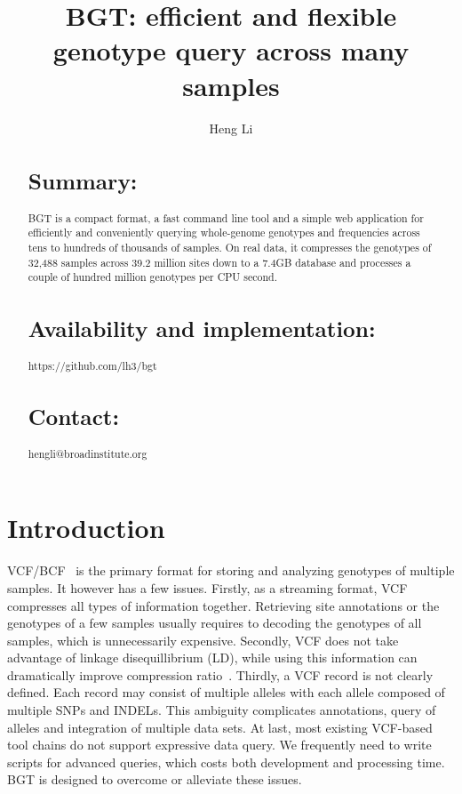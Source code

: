 \documentclass{bioinfo}
\begin{document}

\title[Large-scale Genotype Query]{BGT: efficient and flexible genotype query across many samples}

\author[Li]{Heng Li}

\address{Broad Institute, 7 Cambridge Center, Cambridge, MA 02142, USA}

\maketitle

\begin{abstract}
\section{Summary:} BGT is a compact format, a fast command line tool and a
simple web application for efficiently and conveniently querying whole-genome
genotypes and frequencies across tens to hundreds of thousands of samples.
On real data, it compresses the genotypes of 32,488 samples across 39.2
million sites down to a 7.4GB database and processes a couple of hundred
million genotypes per CPU second.

\section{Availability and implementation:} https://github.com/lh3/bgt

\section{Contact:} hengli@broadinstitute.org
\end{abstract}

\section{Introduction}

VCF/BCF~\citep{Danecek:2011qy} is the primary format for storing and analyzing
genotypes of multiple samples.  It however has a few issues. Firstly, as a
streaming format, VCF compresses all types of information together. Retrieving
site annotations or the genotypes of a few samples usually requires to decoding
the genotypes of all samples, which is unnecessarily expensive. Secondly, VCF
does not take advantage of linkage disequillibrium (LD), while using this
information can dramatically improve compression ratio~\citep{Durbin:2014yq}.
Thirdly, a VCF record is not clearly defined. Each record may consist of
multiple alleles with each allele composed of multiple SNPs and INDELs. This
ambiguity complicates annotations, query of alleles and integration of multiple
data sets. At last, most existing VCF-based tool chains do not support
expressive data query.  We frequently need to write scripts for advanced
queries, which costs both development and processing time. BGT is designed to
overcome or alleviate these issues.
\end{document}

